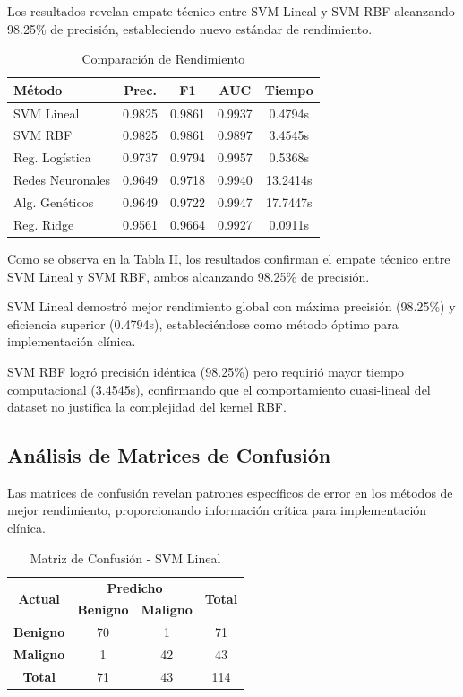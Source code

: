 \documentclass[conference]{IEEEtran}
\begin{document}
Los resultados revelan empate técnico entre SVM Lineal y SVM RBF alcanzando 98.25\% de precisión, estableciendo nuevo estándar de rendimiento.

\begin{table}[htbp]
\caption{Comparación de Rendimiento}
\begin{center}
\footnotesize
\begin{tabular}{|l|c|c|c|c|}
\hline
\textbf{Método} & \textbf{Prec.} & \textbf{F1} & \textbf{AUC} & \textbf{Tiempo} \\
\hline
SVM Lineal & 0.9825 & 0.9861 & 0.9937 & 0.4794s \\
\hline
SVM RBF & 0.9825 & 0.9861 & 0.9897 & 3.4545s \\
\hline
Reg. Logística & 0.9737 & 0.9794 & 0.9957 & 0.5368s \\
\hline
Redes Neuronales & 0.9649 & 0.9718 & 0.9940 & 13.2414s \\
\hline
Alg. Genéticos & 0.9649 & 0.9722 & 0.9947 & 17.7447s \\
\hline
Reg. Ridge & 0.9561 & 0.9664 & 0.9927 & 0.0911s \\
\hline
\end{tabular}
\label{tab2}
\end{center}
\end{table}


Como se observa en la Tabla II, los resultados confirman el empate técnico entre SVM Lineal y SVM RBF, ambos alcanzando 98.25\% de precisión.

SVM Lineal demostró mejor rendimiento global con máxima precisión (98.25\%) y eficiencia superior (0.4794s), estableciéndose como método óptimo para implementación clínica.

SVM RBF logró precisión idéntica (98.25\%) pero requirió mayor tiempo computacional (3.4545s), confirmando que el comportamiento cuasi-lineal del dataset no justifica la complejidad del kernel RBF.
\subsection{Análisis de Matrices de Confusión}

Las matrices de confusión revelan patrones específicos de error en los métodos de mejor rendimiento, proporcionando información crítica para implementación clínica.

\begin{table}[htbp]
\caption{Matriz de Confusión - SVM Lineal}
\begin{center}
\footnotesize
\begin{tabular}{|c|c|c|c|}
\hline
\multirow{2}{*}{\textbf{Actual}} & \multicolumn{2}{c|}{\textbf{Predicho}} & \multirow{2}{*}{\textbf{Total}} \\
\cline{2-3}
 & \textbf{Benigno} & \textbf{Maligno} & \\
\hline
\textbf{Benigno} & 70 & 1 & 71 \\
\hline
\textbf{Maligno} & 1 & 42 & 43 \\
\hline
\textbf{Total} & 71 & 43 & 114 \\
\hline
\end{tabular}
\label{tab5}
\end{center}
\end{table}
\end{document}
